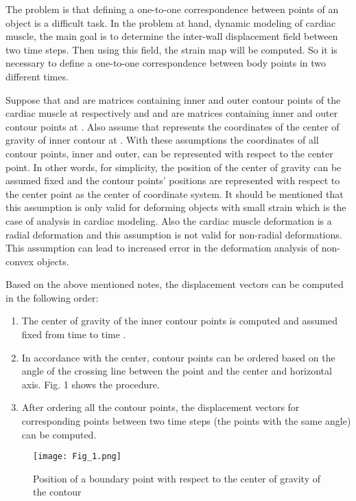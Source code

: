 \documentclass{jicspack}
\begin{document}
The problem is that defining a one-to-one correspondence between points of an object is a
difficult task. In the problem at hand, dynamic modeling of cardiac muscle, the main goal is to determine the
inter-wall displacement field between two time steps. Then using this field, the strain map
will be computed. So it is necessary to define a one-to-one correspondence between body
points in two different times. 

Suppose that  and  are matrices containing inner and outer contour points of the
cardiac muscle at  respectively and  and  are matrices containing inner
and outer contour points at . Also assume that  represents the coordinates
of the center of gravity of inner contour at . With these assumptions the coordinates
of all contour points, inner and outer, can be represented with respect to the center point. In
other words, for simplicity, the position of the center of gravity can be assumed fixed and the
contour points' positions are represented with respect to the center point as the center of
coordinate system. It should be mentioned that this assumption is only valid for deforming
objects with small strain which is the case of analysis in cardiac modeling. Also the cardiac
muscle deformation is a radial deformation and this assumption is not valid for non-radial
deformations. This assumption can lead to increased error in the deformation analysis of non-convex objects. 

Based on the above mentioned notes, the displacement vectors can be computed in the
following order:
\begin{enumerate}
\item The center of gravity of the inner contour points is computed and assumed fixed
from time  to time .
\item In accordance with the center, contour points can be ordered based on the angle of the crossing line between the point and the center and horizontal axis. Fig. 1
shows the procedure.
\item After ordering all the contour points, the displacement vectors for corresponding
points between two time steps (the points with the same angle) can be computed. 
\end{enumerate}

\begin{figure}
\centering
\texttt{[image: Fig\_1.png]}
\caption{Position of a boundary point with respect to the center of gravity of the contour}
\end{figure}
\end{document}
